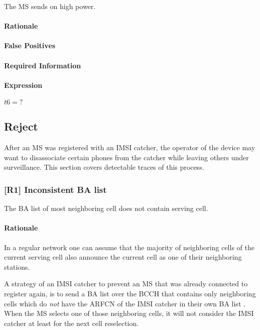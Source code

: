 \documentclass[a4paper,11pt,notitlepage,bigheadings,oneside]{scrartcl}
\begin{document}
The MS sends on high power.

\paragraph{Rationale}


\paragraph{False Positives}


\paragraph{Required Information}


\paragraph{Expression}

$t6 = ?$

\subsection{Reject}

After an MS was registered with an IMSI catcher, the operator of the device may
want to disassociate certain phones from the catcher while leaving others under
surveillance. This section covers detectable traces of this process.

\subsubsection{[R1] Inconsistent BA list}

The BA list of most neighboring cell does not contain serving cell.

\paragraph{Rationale}

In a regular network one can assume that the majority of neighboring cells of
the current serving cell also announce the current cell as one of their
neighboring stations. 

A strategy of an IMSI catcher to prevent an MS that was already connected to
register again, is to send a BA list over the BCCH that contains only
neighboring cells which do \emph{not} have the ARFCN of the IMSI catcher in
their own BA list \cite[0027]{bott2000verfahren}. When the MS selects one of
those neighboring cells, it will not consider the IMSI catcher at least for the
next cell reselection.
\end{document}
